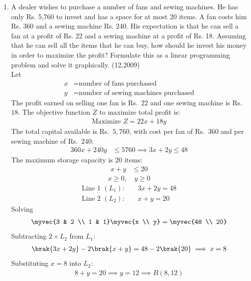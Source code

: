 \begin{enumerate}[label=\thesubsection.\arabic*, ref=\thesubsection.\theenumi]
 \item A dealer wishes to purchase a number of fans and sewing machines. He has only Rs. 5,760 to invest and has a space for at most 20 items. A fan costs him Rs. 360 and a sewing machine Rs. 240. His expectation is that he can sell a fan at a profit of Rs. 22 and a sewing machine at a profit of Rs. 18. Assuming that he can sell all the items that he can buy, how should he invest his money in order to maximize the profit? Formulate this as a linear programming problem and solve it graphically.
 \hfill{(12,2009)} \\
 \solution
 Let 
 \begin{align}
 	x &= \text{number of fans purchased} \\
 	y &= \text{number of sewing machines purchased}
 \end{align}
 The profit earned on selling one fan is Rs.~$22$ and one sewing machine is Rs.~$18$. The objective function $Z$ to maximize total profit is:
 \begin{align}
 	\text{Maximize } Z = 22x + 18y
 	\label{eq:EE26BTECH11202-objective}
 \end{align}
 The total capital available is Rs.~$5,760$, with cost per fan of Rs.~$360$ and per sewing machine of Rs.~$240$:
 \begin{align}
 	360x + 240y &\le 5760 \implies   3x + 2y \le 48
 \end{align}
 The maximum storage capacity is $20$ items:
 \begin{align}
 	x + y &\le 20
 	\label{eq:EE26BTECH11202-space_constraint}
 \end{align}
 \begin{align}
 	x \ge 0, \quad y \ge 0
 	\label{eq:EE26BTECH11202-non_negativity}
 \end{align}
 \begin{align}
 	\text{Line 1 } (L_1): & \quad 3x + 2y = 48
 	\\
 	\text{Line 2 } (L_2): & \quad x + y = 20
 \end{align}
 Solving
 \begin{align}
 	\myvec{3 & 2 \\ 1 & 1} \myvec{x \\ y} = \myvec{48 \\ 20}
 \end{align}
 Subtracting $2 \times L_2$ from $L_1$:
 \begin{align}
 	\brak{3x + 2y} - 2\brak{x + y} = 48 - 2\brak{20} \implies x = 8
 \end{align}
 Substituting $x = 8$ into $L_2$:
 \begin{align}
 	8 + y = 20 \implies y = 12 \implies B(8, 12)
 \end{align}
 

\end{enumerate}
